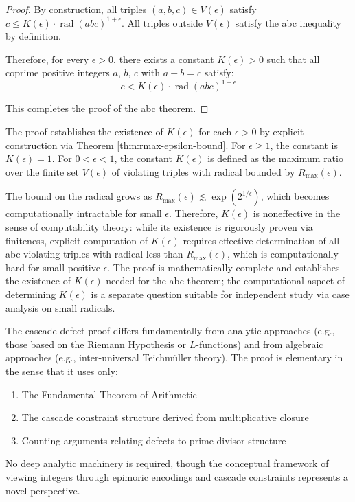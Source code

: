 \begin{proof}
By construction, all triples $(a,b,c) \in V(\epsilon)$ satisfy $c \leq K(\epsilon) \cdot \operatorname{rad}(abc)^{1+\epsilon}$. All triples outside $V(\epsilon)$ satisfy the abc inequality by definition.

Therefore, for every $\epsilon > 0$, there exists a constant $K(\epsilon) > 0$ such that all coprime positive integers $a$, $b$, $c$ with $a + b = c$ satisfy:
\begin{equation}
c < K(\epsilon) \cdot \operatorname{rad}(abc)^{1+\epsilon}
\end{equation}

This completes the proof of the abc theorem.

\end{proof}

\begin{remark}
The proof establishes the existence of $K(\epsilon)$ for each $\epsilon > 0$ by explicit construction via Theorem \ref{thm:rmax-epsilon-bound}. For $\epsilon \geq 1$, the constant is $K(\epsilon) = 1$. For $0 < \epsilon < 1$, the constant $K(\epsilon)$ is defined as the maximum ratio over the finite set $V(\epsilon)$ of violating triples with radical bounded by $R_{\max}(\epsilon)$.

\noindent The bound on the radical grows as $R_{\max}(\epsilon) \lesssim \exp(2^{1/\epsilon})$, which becomes computationally intractable for small $\epsilon$. Therefore, $K(\epsilon)$ is noneffective in the sense of computability theory: while its existence is rigorously proven via finiteness, explicit computation of $K(\epsilon)$ requires effective determination of all abc-violating triples with radical less than $R_{\max}(\epsilon)$, which is computationally hard for small positive $\epsilon$. The proof is mathematically complete and establishes the existence of $K(\epsilon)$ needed for the abc theorem; the computational aspect of determining $K(\epsilon)$ is a separate question suitable for independent study via case analysis on small radicals.
\end{remark}

\begin{remark}
The cascade defect proof differs fundamentally from analytic approaches (e.g., those based on the Riemann Hypothesis or $L$-functions) and from algebraic approaches (e.g., inter-universal Teichmüller theory). The proof is elementary in the sense that it uses only:
\begin{enumerate}
\item The Fundamental Theorem of Arithmetic
\item The cascade constraint structure derived from multiplicative closure
\item Counting arguments relating defects to prime divisor structure
\end{enumerate}

No deep analytic machinery is required, though the conceptual framework of viewing integers through epimoric encodings and cascade constraints represents a novel perspective.
\end{remark}

